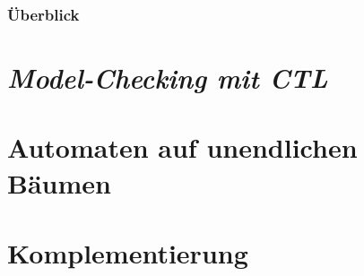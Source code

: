   \begin{frame}
  \frametitle{Überblick}
    \tableofcontents
  \end{frame}
  
  \section[\protect\emph{Model-Checking CTL}]{\protect\emph{Model-Checking mit CTL}}
  

  \section[Baumautomaten]{Automaten auf unendlichen Bäumen}
  

  \section[Komplementierung]{Komplementierung} %
  

  \AtBeginSection{\relax}
%  

% 
 


